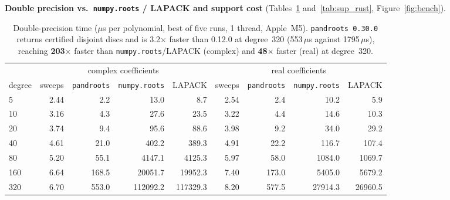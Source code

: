 \documentclass[10pt,a4paper]{article}
\theoremstyle{definition}
\numberwithin{equation}{section}
\begin{document}
\textbf{Double precision vs.\ \texttt{numpy.roots} / LAPACK and support cost} (Tables~\ref{tab:time} and~\ref{tab:sup_rust}, Figure~\ref{fig:bench}).

\begin{table}[H]\centering\small\setlength{\tabcolsep}{4.3pt}
\begin{tabular}{lrrrr@{\qquad}rrrr}
\toprule
 & \multicolumn{4}{c}{complex coefficients} & \multicolumn{4}{c}{real coefficients}\\
degree & sweeps & \texttt{pandroots} & \texttt{numpy.roots} & LAPACK & sweeps & \texttt{pandroots} & \texttt{numpy.roots} & LAPACK\\
\midrule
5   & 2.44 &   2.2 &    13.0 &     8.7 & 2.54 &   2.4 &    10.2 &     5.9\\
10  & 3.16 &   4.3 &    27.6 &    23.5 & 3.22 &   4.4 &    14.6 &    10.3\\
20  & 3.74 &   9.4 &    95.6 &    88.6 & 3.98 &   9.2 &    34.0 &    29.2\\
40  & 4.61 &  21.0 &   402.2 &   389.3 & 4.91 &  22.2 &   116.7 &   107.4\\
80  & 5.20 &  55.1 &  4147.1 &  4125.3 & 5.97 &  58.0 &  1084.0 &  1069.7\\
160 & 6.64 & 168.5 & 20051.7 & 19952.3 & 7.40 & 173.0 &  5405.0 &  5679.2\\
320 & 6.70 & 553.0 & 112092.2 & 117329.3 & 8.20 & 577.5 & 27914.3 & 26960.5\\
\bottomrule
\end{tabular}
\caption{Double-precision time ($\mu$s per polynomial, best of five runs, 1 thread, Apple~M5). \texttt{pandroots 0.30.0} returns certified disjoint discs and is 3.2$\times$ faster than 0.12.0 at degree~320 (553\,$\mu$s against 1795\,$\mu$s), reaching \textbf{203$\times$} faster than \texttt{numpy.roots}/LAPACK (complex) and \textbf{48$\times$} faster (real) at degree~320.}\label{tab:time}
\end{table}
\end{document}

